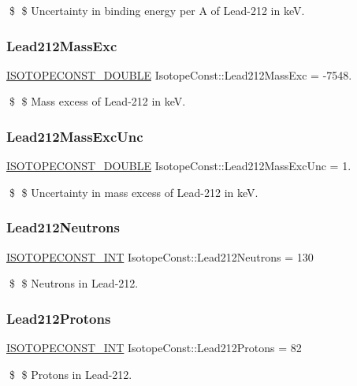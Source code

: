 \$ \$ Uncertainty in binding energy per A of Lead-\/212 in keV. \mbox{\label{group___isotope_const-_lead-_pb212_gac052ec679bf9dd14263b23f4e71e1cca}} 
\subsubsection{\texorpdfstring{Lead212\+Mass\+Exc}{Lead212MassExc}}
{\footnotesize\ttfamily \mbox{\hyperlink{group___isotope_const-_macros_ga8f45a7272ce02c0b4c65c44636ed719a}{I\+S\+O\+T\+O\+P\+E\+C\+O\+N\+S\+T\+\_\+\+D\+O\+U\+B\+LE}} Isotope\+Const\+::\+Lead212\+Mass\+Exc = -\/7548.}

\$ \$ Mass excess of Lead-\/212 in keV. \mbox{\label{group___isotope_const-_lead-_pb212_gabca317bb46cf6ca1081244484823f704}} 
\subsubsection{\texorpdfstring{Lead212\+Mass\+Exc\+Unc}{Lead212MassExcUnc}}
{\footnotesize\ttfamily \mbox{\hyperlink{group___isotope_const-_macros_ga8f45a7272ce02c0b4c65c44636ed719a}{I\+S\+O\+T\+O\+P\+E\+C\+O\+N\+S\+T\+\_\+\+D\+O\+U\+B\+LE}} Isotope\+Const\+::\+Lead212\+Mass\+Exc\+Unc = 1.}

\$ \$ Uncertainty in mass excess of Lead-\/212 in keV. \mbox{\label{group___isotope_const-_lead-_pb212_gaad8c8302b5b573a47429bced4d73a99f}} 
\subsubsection{\texorpdfstring{Lead212\+Neutrons}{Lead212Neutrons}}
{\footnotesize\ttfamily \mbox{\hyperlink{group___isotope_const-_macros_ga5f18360b3e99483a35c32d789e62621c}{I\+S\+O\+T\+O\+P\+E\+C\+O\+N\+S\+T\+\_\+\+I\+NT}} Isotope\+Const\+::\+Lead212\+Neutrons = 130}

\$ \$ Neutrons in Lead-\/212. \mbox{\label{group___isotope_const-_lead-_pb212_gacfbb824f3bf2ef674cd7ae95b87a9434}} 
\subsubsection{\texorpdfstring{Lead212\+Protons}{Lead212Protons}}
{\footnotesize\ttfamily \mbox{\hyperlink{group___isotope_const-_macros_ga5f18360b3e99483a35c32d789e62621c}{I\+S\+O\+T\+O\+P\+E\+C\+O\+N\+S\+T\+\_\+\+I\+NT}} Isotope\+Const\+::\+Lead212\+Protons = 82}

\$ \$ Protons in Lead-\/212. 